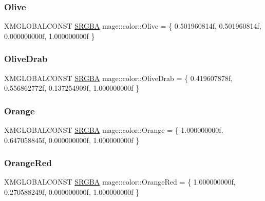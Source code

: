 \hypertarget{namespacemage_1_1color_ac172a37ab875981c5187f951b30ef49c}{}\label{namespacemage_1_1color_ac172a37ab875981c5187f951b30ef49c} 
\subsubsection{\texorpdfstring{Olive}{Olive}}
{\footnotesize\ttfamily X\+M\+G\+L\+O\+B\+A\+L\+C\+O\+N\+ST \hyperlink{structmage_1_1_s_r_g_b_a}{S\+R\+G\+BA} mage\+::color\+::\+Olive = \{ 0.\+501960814f, 0.\+501960814f, 0.\+000000000f, 1.\+000000000f \}}

\hypertarget{namespacemage_1_1color_a0ab436320d35ca9a76712cfba4680dfc}{}\label{namespacemage_1_1color_a0ab436320d35ca9a76712cfba4680dfc} 
\subsubsection{\texorpdfstring{Olive\+Drab}{OliveDrab}}
{\footnotesize\ttfamily X\+M\+G\+L\+O\+B\+A\+L\+C\+O\+N\+ST \hyperlink{structmage_1_1_s_r_g_b_a}{S\+R\+G\+BA} mage\+::color\+::\+Olive\+Drab = \{ 0.\+419607878f, 0.\+556862772f, 0.\+137254909f, 1.\+000000000f \}}

\hypertarget{namespacemage_1_1color_af8de9ab27c7f398abf1e4bbe62e67a1c}{}\label{namespacemage_1_1color_af8de9ab27c7f398abf1e4bbe62e67a1c} 
\subsubsection{\texorpdfstring{Orange}{Orange}}
{\footnotesize\ttfamily X\+M\+G\+L\+O\+B\+A\+L\+C\+O\+N\+ST \hyperlink{structmage_1_1_s_r_g_b_a}{S\+R\+G\+BA} mage\+::color\+::\+Orange = \{ 1.\+000000000f, 0.\+647058845f, 0.\+000000000f, 1.\+000000000f \}}

\hypertarget{namespacemage_1_1color_af12d9b64fbe74be8503aea6dbd47ad2f}{}\label{namespacemage_1_1color_af12d9b64fbe74be8503aea6dbd47ad2f} 
\subsubsection{\texorpdfstring{Orange\+Red}{OrangeRed}}
{\footnotesize\ttfamily X\+M\+G\+L\+O\+B\+A\+L\+C\+O\+N\+ST \hyperlink{structmage_1_1_s_r_g_b_a}{S\+R\+G\+BA} mage\+::color\+::\+Orange\+Red = \{ 1.\+000000000f, 0.\+270588249f, 0.\+000000000f, 1.\+000000000f \}}

